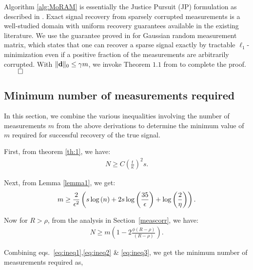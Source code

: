 {Algorithm \ref{alg:MoRAM} is essentially the Justice Pursuit (JP) formulation as described in \cite{Laska2009}. Exact signal recovery from sparsely corrupted measurements is a well-studied domain with uniform recovery guarantees available in the existing literature. We use the guarantee proved in \cite{li2013compressed} for Gaussian random measurement matrix, which states that one can recover a sparse signal exactly by tractable $\ell_1$-minimization even if a positive fraction of the measurements are arbitrarily corrupted. With $\|\mathbf{d}\|_0 \leq \gamma m$, we invoke Theorem $1.1$ from \cite{li2013compressed} to complete the proof.
$\qed$}

\subsection{Minimum number of measurements required}
In this section, we combine the various inequalities involving the number of measurements $m$ from the above derivations to determine the minimum value of $m$ required for successful recovery of the true signal.

First, from theorem \ref{th:1}, we have:
\begin{align}
N \geq C\left(\frac{t}{\kappa}\right)^2s.
\label{eq:ineq1}
\end{align}

Next, from Lemma \ref{lemma1}, we get:
\begin{align}
m \geq \frac{2}{\eps^2}\left(s\log{(n)} + 2s\log{\left(\frac{35}{\eps}\right)}+\log{\left(\frac{2}{\eta}\right)}\right).
\label{eq:ineq2}
\end{align}

Now for $R> \rho$, from the analysis in Section~\ref{meascorr}, we have:
\begin{align}
N \geq m \left(1-2\frac{\phi(R-\rho)}{(R-\rho)} \right).
\label{eq:ineq3}
\end{align}

Combining eqs.~\ref{eq:ineq1},\ref{eq:ineq2} \& \ref{eq:ineq3}, we get the minimum number of measurements required as,

